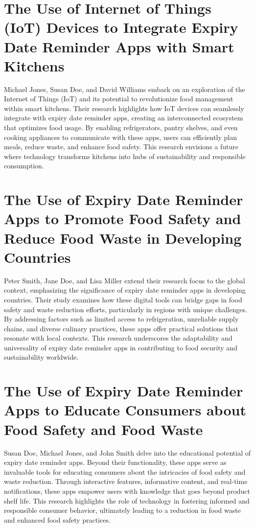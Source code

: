 \section{The Use of Internet of Things (IoT) Devices to Integrate Expiry Date Reminder Apps with Smart Kitchens }
Michael Jones, Susan Doe, and David Williams embark on an exploration of the Internet of Things (IoT) and its potential to revolutionize food management within smart kitchens. Their research highlights how IoT devices can seamlessly integrate with expiry date reminder apps, creating an interconnected ecosystem that optimizes food usage. By enabling refrigerators, pantry shelves, and even cooking appliances to communicate with these apps, users can efficiently plan meals, reduce waste, and enhance food safety. This research envisions a future where technology transforms kitchens into hubs of sustainability and responsible consumption.

\section{The Use of Expiry Date Reminder Apps to Promote Food Safety and Reduce Food Waste in Developing Countries }
Peter Smith, Jane Doe, and Lisa Miller extend their research focus to the global context, emphasizing the significance of expiry date reminder apps in developing countries. Their study examines how these digital tools can bridge gaps in food safety and waste reduction efforts, particularly in regions with unique challenges. By addressing factors such as limited access to refrigeration, unreliable supply chains, and diverse culinary practices, these apps offer practical solutions that resonate with local contexts. This research underscores the adaptability and universality of expiry date reminder apps in contributing to food security and sustainability worldwide.

\section{The Use of Expiry Date Reminder Apps to Educate Consumers about Food Safety and Food Waste }
Susan Doe, Michael Jones, and John Smith delve into the educational potential of expiry date reminder apps. Beyond their functionality, these apps serve as invaluable tools for educating consumers about the intricacies of food safety and waste reduction. Through interactive features, informative content, and real-time notifications, these apps empower users with knowledge that goes beyond product shelf life. This research highlights the role of technology in fostering informed and responsible consumer behavior, ultimately leading to a reduction in food waste and enhanced food safety practices.

